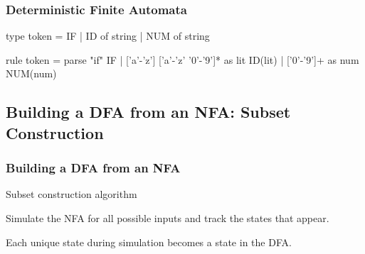 \documentclass{plt}
\begin{document}
\begin{frame}[fragile=singleslide]
  \frametitle{Deterministic Finite Automata}

\begin{ocamllex}
{ type token = IF | ID of string | NUM of string }

rule token =
  parse "if"                                { IF }
      | ['a'-'z'] ['a'-'z' '0'-'9']* as lit { ID(lit) }
      | ['0'-'9']+                   as num { NUM(num) }
\end{ocamllex}


\end{frame}

\subsection{Building a DFA from an NFA: Subset Construction}

\begin{frame}
  \frametitle{Building a DFA from an NFA}

Subset construction algorithm

Simulate the NFA for all possible inputs and track the states that
appear.

Each unique state during simulation becomes a state in the DFA.

\end{frame}

\def\aabb#1#2#3#4#5#6#7#8#9{
\begin{scope}[node distance=3pt and 2pt,
                      every state/.style={inner sep=1pt,
                        fill=white,
                        minimum size=5pt}]
    \node [state,fill=\filled#2] at ($(#1)+(left:1)$) (0) {};
    \node [state,fill=\filled#3,right=of 0] (1) {};
    \node [state,fill=\filled#4,above right=of 1] (2) {};
    \node [state,fill=\filled#5,right=of 2] (3) {};
    \node [state,fill=\filled#6,below right=of 1] (4) {};
    \node [state,fill=\filled#7,right=of 4] (5) {};
    \node [state,fill=\filled#8,below right=of 3] (6) {};
    \node [state,fill=\filled#9,right=of 6] (7) {};
\aabbtwo
}
\end{document}
